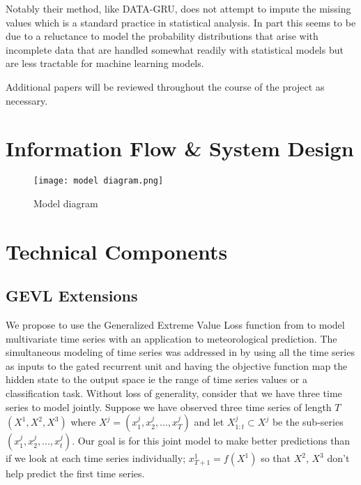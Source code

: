 \documentclass[conference]{IEEEtran}
\begin{document}
Notably their method, like DATA-GRU, does not attempt to impute the missing values which is a standard practice in statistical analysis. In part this seems to be due to a reluctance to model the probability distributions that arise with incomplete data that are handled somewhat readily with statistical models but are less tractable for machine learning models.

Additional papers will be reviewed throughout the course of the project as necessary.

\section{Information Flow \& System Design}

\begin{figure}[h]
    \centering
    \texttt{[image: model diagram.png]}
    \caption{Model diagram}
    \label{fig:model-diagram}
\end{figure}

\section{Technical Components}

\subsection{GEVL Extensions}


We propose to use the Generalized Extreme Value Loss function from \cite{zhangEnhancingTimeSeries2021} to model multivariate time series with an application to meteorological prediction. The simultaneous modeling of time series was addressed in \cite{tanDATAGRUDualAttentionTimeAware2020, rouhiardeshiriMultivariateGatedRecurrent2021, wuDataImputationMultivariate2022, zhangEnhancingTimeSeries2021} by using all the time series as inputs to the gated recurrent unit and having the objective function map the hidden state to the output space ie the range of time series values or a classification task. Without loss of generality, consider that we have three time series to model jointly. Suppose we have observed three time series of length $T$ $(X^1, X^2, X^3)$ where $X^j = (x_1^j, x_2^j, ..., x_T^j)$ and let $X^j_{1:t} \subset X^j$ be the sub-series $(x_1^j, x_2^j, ..., x_t^j)$. Our goal is for this joint model to make better predictions than if we look at each time series individually; $x^1_{T+1} = f(X^1)$ so that $X^2$, $X^3$ don’t help predict the first time series. 
\end{document}
